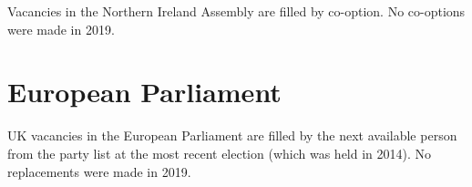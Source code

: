 \documentclass[a4paper,openany]{book}
\begin{document}
Vacancies in the Northern Ireland Assembly are filled by co-option.
No co-options were made in 2019.
%

\section{European Parliament}

UK vacancies in the European Parliament are filled by the next available person from the party list at the most recent election (which was held in 2014). 
No replacements were made in 2019.
\end{document}
